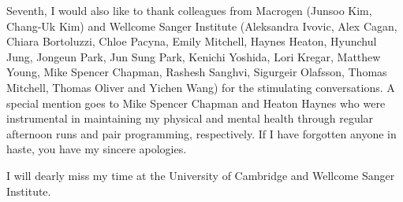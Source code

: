 \begin{acknowledgements}
Seventh, I would also like to thank colleagues from Macrogen (Junsoo Kim, Chang-Uk Kim) and Wellcome Sanger Institute (Aleksandra Ivovic, Alex Cagan, Chiara Bortoluzzi, Chloe Pacyna, Emily Mitchell, Haynes Heaton, Hyunchul Jung, Jongeun Park, Jun Sung Park, Kenichi Yoshida, Lori Kregar, Matthew Young, Mike Spencer Chapman, Rashesh Sanghvi, Sigurgeir Olafsson, Thomas Mitchell, Thomas Oliver and Yichen Wang) for the stimulating conversations. A special mention goes to Mike Spencer Chapman and Heaton Haynes who were instrumental in maintaining my physical and mental health through regular afternoon runs and pair programming, respectively. If I have forgotten anyone in haste, you have my sincere apologies. 

I will dearly miss my time at the University of Cambridge and Wellcome Sanger Institute.


\end{acknowledgements}
